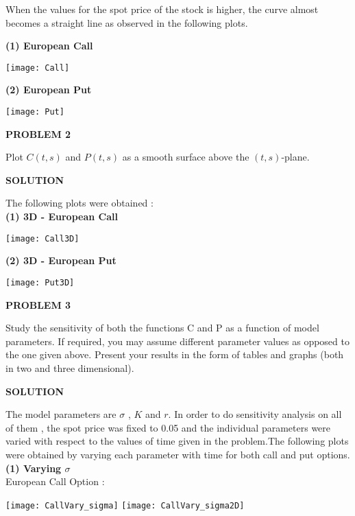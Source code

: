 \documentclass{article}
\begin{document}
When the values for the spot price of the stock is higher, the curve almost becomes a straight line as observed in the following plots.

\textbf{(1) European Call}
\begin{center}
\texttt{[image: Call]}
\end{center}

\textbf{(2) European Put}
\begin{center}
\texttt{[image: Put]}
\end{center} 

\begin{center}
\textbf{PROBLEM 2}
\end{center}
Plot $C(t, s)$ and $P(t, s)$ as a smooth surface above the $(t, s)$-plane.

\begin{center}
\textbf{SOLUTION}
\end{center}

The following plots were obtained :\\
\textbf{(1) 3D - European Call}
\begin{center}
\texttt{[image: Call3D]}
\end{center}

\textbf{(2) 3D - European Put}
\begin{center}
\texttt{[image: Put3D]}
\end{center}

\begin{center}
\textbf{PROBLEM 3}
\end{center}
Study the sensitivity of both the functions C and P as a function of model parameters. If required, you may
assume different parameter values as opposed to the one given above. Present your results in the form of tables
and graphs (both in two and three dimensional).

\begin{center}
\textbf{SOLUTION}
\end{center}
The model parameters are $\sigma$ , $K$ and $r$. In order to do sensitivity analysis on all of them , the spot price was fixed to 0.05 and the individual parameters were varied with respect to the values of time given in the problem.The following plots were obtained by varying each parameter with time for both call and put options.\\

\textbf{(1) Varying $\sigma$}\\
European Call Option :
\begin{center}
\texttt{[image: CallVary\_sigma]}
\quad \quad
\texttt{[image: CallVary\_sigma2D]}
\end{center}
\end{document}
